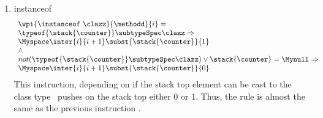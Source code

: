 \begin{itemize}
\begin{enumerate}
						\item instanceof
						$$ \begin{array}{l}
                                                    \wpi{\instanceof \  \clazz } {\methodd}{i}  = \\
							 \typeof{ \stack{\counter}} \subtypeSpec \clazz  \Rightarrow \\
								\Myspace  	 \inter{i}{i+1} \subst{ \stack{\counter } } {  1  } \\
									 \wedge \\
								not(  \typeof{\stack{\counter}} \subtypeSpec  \clazz  )  \vee  \stack{\counter} = \Mynull \Rightarrow \\
								\Myspace   \inter{i}{i+1} \subst{  \stack{\counter } }{ 0 } \\	  
						\end{array} 	$$
						  This instruction, depending on if the stack top element can be cast to the class type \clazz \ pushes on the stack 
						  top either 0 or 1.
						  Thus, the rule is almost the same as the previous instruction \checkcast.
					

\end{enumerate}
\end{itemize}
